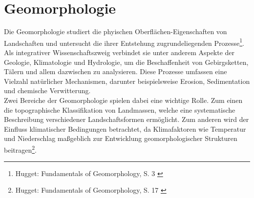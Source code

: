 
\section{Geomorphologie}

Die Geomorphologie studiert die phyischen Oberflächen-Eigenschaften von Landschaften und untersucht die ihrer Entstehung zugrundeliegenden Prozesse\footnote{
    Hugget: Fundamentals of Geomorphology, S. 3
    \cite{huggett2022fundamentals}
}. Als integrativer Wissenschaftszweig verbindet sie unter anderem Aspekte der Geologie, Klimatologie und Hydrologie, um die Beschaffenheit von Gebirgsketten, Tälern und allem dazwischen zu analysieren. Diese Prozesse umfassen eine Vielzahl natürlicher Mechanismen, darunter beispielsweise Erosion, Sedimentation und chemische Verwitterung. \\
Zwei Bereiche der Geomorphologie spielen dabei eine wichtige Rolle. Zum einen die topographische Klassifikation von Landmassen, welche eine systematische Beschreibung verschiedener Landschaftsformen ermöglicht. Zum anderen wird der Einfluss klimatischer Bedingungen betrachtet, da Klimafaktoren wie Temperatur und Niederschlag maßgeblich zur Entwicklung geomorphologischer Strukturen beitragen\footnote{
    Hugget: Fundamentals of Geomorphology, S. 17
    \cite{huggett2022fundamentals}
}.




